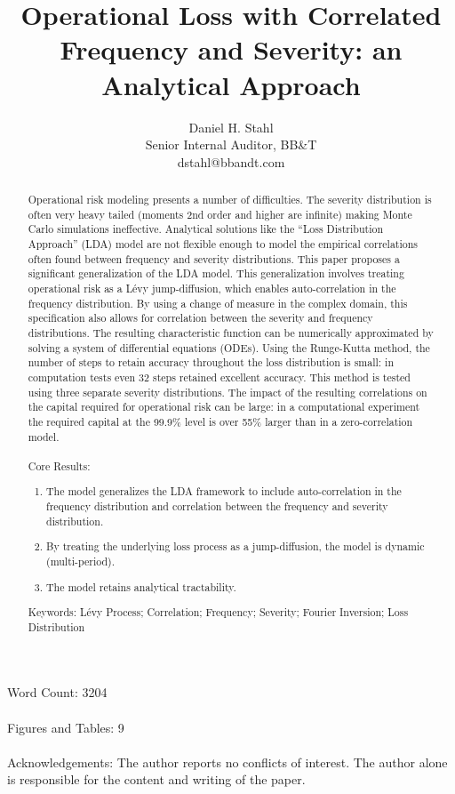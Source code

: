 \documentclass{article}
\theoremstyle{definition}
\begin{document}
\title{Operational Loss with Correlated Frequency and Severity: an Analytical Approach}
\date{}
\author{Daniel H. Stahl\\Senior Internal Auditor, BB\&T
        \\dstahl@bbandt.com}

\maketitle
Word Count: 3204
\\
\\
Figures and Tables: 9
\\
\\
Acknowledgements: The author reports no conflicts of interest.  The author alone is responsible for the content and writing of the paper.
\newpage
 \begin{abstract}
Operational risk modeling presents a number of difficulties. The severity distribution is often very heavy tailed (moments 2nd order and higher are infinite) making Monte Carlo simulations ineffective.  Analytical solutions like the ``Loss Distribution Approach'' (LDA) model are not flexible enough to model the empirical correlations often found between frequency and severity distributions.  This paper proposes a significant generalization of the LDA model.  This generalization involves treating operational risk as a L\'evy jump-diffusion, which enables auto-correlation in the frequency distribution.  By using a change of measure in the complex domain, this specification also allows for correlation between the severity and frequency distributions. The resulting characteristic function can be numerically approximated by solving a system of differential equations (ODEs).  Using the Runge-Kutta method, the number of steps to retain accuracy throughout the loss distribution is small: in computation tests even 32 steps retained excellent accuracy. This method is tested using three separate severity distributions.  The impact of the resulting correlations on the capital required for operational risk can be large:  in a computational experiment the required capital at the 99.9\% level is over 55\% larger than in a zero-correlation model.  
\\
\\
Core Results:
\begin{enumerate}
\item The model generalizes the LDA framework to include auto-correlation in the frequency distribution and correlation between the frequency and severity distribution.
\item By treating the underlying loss process as a jump-diffusion, the model is dynamic (multi-period).
\item The model retains analytical tractability.
\end{enumerate}

Keywords: L\'evy Process; Correlation; Frequency; Severity; Fourier Inversion; Loss Distribution
\end{abstract}
\end{document}
